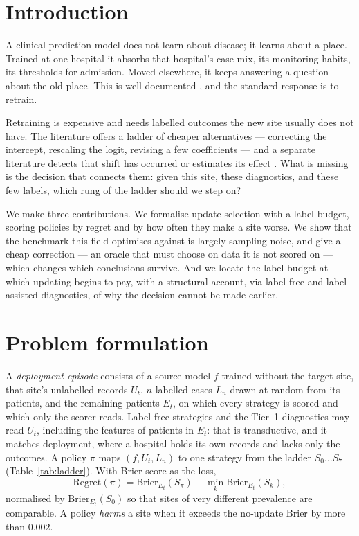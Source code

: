 \documentclass[10pt,twocolumn]{article}
\begin{document}
\section{Introduction}
A clinical prediction model does not learn about disease; it learns about a
place. Trained at one hospital it absorbs that hospital's case mix, its
monitoring habits, its thresholds for admission. Moved elsewhere, it keeps
answering a question about the old place. This is well documented
\cite{finlayson2021}, and the standard response is to retrain.

Retraining is expensive and needs labelled outcomes the new site usually does
not have. The literature offers a ladder of cheaper alternatives --- correcting
the intercept, rescaling the logit, revising a few coefficients
\cite{janssen2008,vergouwe2017} --- and a separate literature detects that
shift has occurred \cite{rabanser2019} or estimates its effect
\cite{garg2022}. What is missing is the decision that connects them: given
this site, these diagnostics, and these few labels, which rung of the ladder
should we step on?

We make three contributions. We formalise update selection with a label
budget, scoring policies by regret and by how often they make a site worse.
We show that the benchmark this field optimises against is largely sampling
noise, and give a cheap correction --- an oracle that must choose on data it
is not scored on --- which changes which conclusions survive. And we locate
the label budget at which updating begins to pay, with a structural account,
via label-free and label-assisted diagnostics, of why the decision cannot be
made earlier.

\section{Problem formulation}
A \emph{deployment episode} consists of a source model $f$ trained without
the target site, that site's unlabelled records $U_t$, $n$ labelled cases
$L_n$ drawn at random from its patients, and the remaining patients $E_t$, on
which every strategy is scored and which only the scorer reads. Label-free
strategies and the Tier~1 diagnostics may read $U_t$, including the features
of patients in $E_t$: that is transductive, and it matches deployment, where
a hospital holds its own records and lacks only the outcomes. A policy $\pi$ maps $(f, U_t, L_n)$ to one
strategy from the ladder $S_0 \ldots S_7$ (Table~\ref{tab:ladder}). With
Brier score as the loss,
\[
\mathrm{Regret}(\pi) = \mathrm{Brier}_{E_t}(S_{\pi})
  - \min_k \mathrm{Brier}_{E_t}(S_k),
\]
normalised by $\mathrm{Brier}_{E_t}(S_0)$ so that sites of very different
prevalence are comparable. A policy \emph{harms} a site when it exceeds the
no-update Brier by more than $0.002$.
\end{document}
